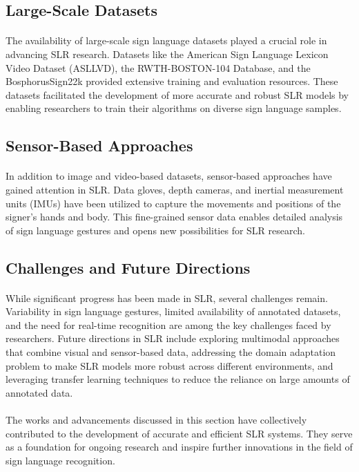 \subsection{Large-Scale Datasets}
\paragraph{}
The availability of large-scale sign language datasets played a crucial role in advancing SLR research. Datasets like the American Sign Language Lexicon Video Dataset (ASLLVD), the RWTH-BOSTON-104 Database, and the BosphorusSign22k provided extensive training and evaluation resources. These datasets facilitated the development of more accurate and robust SLR models by enabling researchers to train their algorithms on diverse sign language samples.

\subsection{Sensor-Based Approaches}
\paragraph{}
In addition to image and video-based datasets, sensor-based approaches have gained attention in SLR. Data gloves, depth cameras, and inertial measurement units (IMUs) have been utilized to capture the movements and positions of the signer's hands and body. This fine-grained sensor data enables detailed analysis of sign language gestures and opens new possibilities for SLR research.

\subsection{Challenges and Future Directions}
\paragraph{}
While significant progress has been made in SLR, several challenges remain. Variability in sign language gestures, limited availability of annotated datasets, and the need for real-time recognition are among the key challenges faced by researchers. Future directions in SLR include exploring multimodal approaches that combine visual and sensor-based data, addressing the domain adaptation problem to make SLR models more robust across different environments, and leveraging transfer learning techniques to reduce the reliance on large amounts of annotated data.
\paragraph{}
The works and advancements discussed in this section have collectively contributed to the development of accurate and efficient SLR systems. They serve as a foundation for ongoing research and inspire further innovations in the field of sign language recognition.
